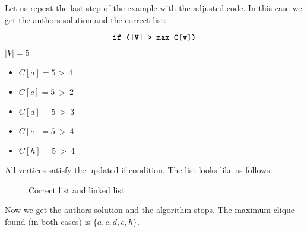 \documentclass[12pt, xcolor=dvipsnames]{scrartcl}
\theoremstyle{definition}
\theoremstyle{definition}
\begin{document}
        Let us repeat the last step of the example with the adjusted code. In this case we get the authors solution and the correct list:

        \[ \textbf{\texttt{if (|V| > max C[v])}} \]

        $|V| = 5 $

        \begin{itemize}
          \item[\textcolor{Green}{\textbullet}] $C[a] = 5 >~ 4$ 
          \item[\textcolor{Green}{\textbullet}] $C[c] = 5 ~>~ 2$
          \item[\textcolor{Green}{\textbullet}] $C[d] = 5 ~>~ 3$
          \item[\textcolor{Green}{\textbullet}] $C[e] = 5 ~>~ 4$
          \item[\textcolor{Green}{\textbullet}] $C[h] = 5 ~>~ 4$
        \end{itemize}

        All vertices satisfy the updated if-condition. The list looks like as follows:

        \begin{figure}[H]
          \centering
        \caption{Correct list and linked list}
        \end{figure}

        Now we get the authors solution and the algorithm stops. The maximum clique found (in both cases) is $\{a,c,d,e,h\}$.

  
   
\end{document}
